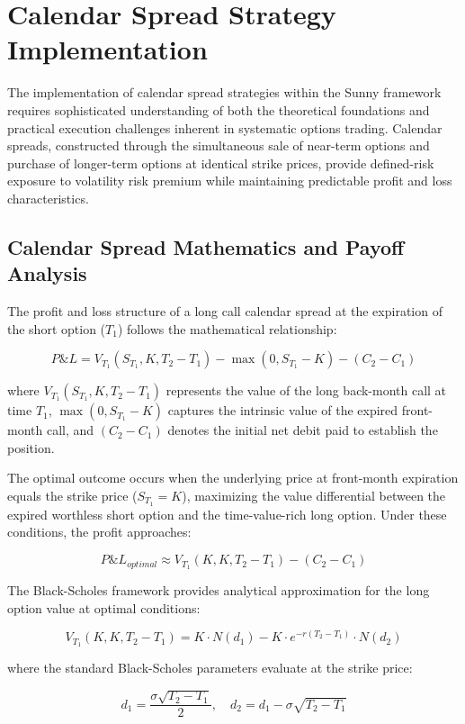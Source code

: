 \documentclass[
  american,
  11pt,
  11pt,
  letterpaper,
  onecolumn]{article}
\begin{document}
\section{Calendar Spread Strategy
Implementation}\label{calendar-spread-strategy-implementation}

The implementation of calendar spread strategies within the Sunny
framework requires sophisticated understanding of both the theoretical
foundations and practical execution challenges inherent in systematic
options trading. Calendar spreads, constructed through the simultaneous
sale of near-term options and purchase of longer-term options at
identical strike prices, provide defined-risk exposure to volatility
risk premium while maintaining predictable profit and loss
characteristics.

\subsection{Calendar Spread Mathematics and Payoff
Analysis}\label{calendar-spread-mathematics-and-payoff-analysis}

The profit and loss structure of a long call calendar spread at the
expiration of the short option (\(T_1\)) follows the mathematical
relationship:

\[P\&L = V_{T_1}(S_{T_1}, K, T_2 - T_1) - \max(0, S_{T_1} - K) - (C_2 - C_1)\]

where \(V_{T_1}(S_{T_1}, K, T_2 - T_1)\) represents the value of the
long back-month call at time \(T_1\), \(\max(0, S_{T_1} - K)\) captures
the intrinsic value of the expired front-month call, and \((C_2 - C_1)\)
denotes the initial net debit paid to establish the position.

The optimal outcome occurs when the underlying price at front-month
expiration equals the strike price (\(S_{T_1} = K\)), maximizing the
value differential between the expired worthless short option and the
time-value-rich long option. Under these conditions, the profit
approaches:

\[P\&L_{optimal} \approx V_{T_1}(K, K, T_2 - T_1) - (C_2 - C_1)\]

The Black-Scholes framework provides analytical approximation for the
long option value at optimal conditions:

\[V_{T_1}(K, K, T_2 - T_1) = K \cdot N(d_1) - K \cdot e^{-r(T_2-T_1)} \cdot N(d_2)\]

where the standard Black-Scholes parameters evaluate at the strike
price:

\[d_1 = \frac{\sigma\sqrt{T_2 - T_1}}{2}, \quad d_2 = d_1 - \sigma\sqrt{T_2 - T_1}\]
\end{document}
